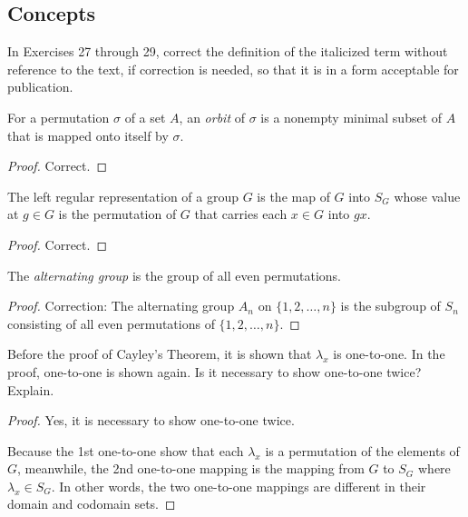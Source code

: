 \subsection*{Concepts}

In Exercises 27 through 29, correct the definition of the italicized term without reference to the text, if correction is needed, so that it is in a form acceptable for publication.

\begin{exercise}
    For a permutation $\sigma$ of a set $A$, an \textit{orbit} of $\sigma$ is a nonempty minimal subset of $A$ that is mapped onto itself by $\sigma$.
\end{exercise}

\begin{proof}
    Correct.
\end{proof}

\begin{exercise}
    The left regular representation of a group $G$ is the map of $G$ into $S_{G}$ whose value at $g\in G$ is the permutation of $G$ that carries each $x\in G$ into $gx$.
\end{exercise}

\begin{proof}
    Correct.
\end{proof}

\begin{exercise}
    The \textit{alternating group} is the group of all even permutations.
\end{exercise}

\begin{proof}
    Correction: The alternating group $A_{n}$ on $\{ 1, 2,\ldots, n \}$ is the subgroup of $S_{n}$ consisting of all even permutations of $\{ 1, 2,\ldots, n \}$.
\end{proof}

\begin{exercise}
    Before the proof of Cayley's Theorem, it is shown that $\lambda_{x}$ is one-to-one. In the proof, one-to-one is shown again. Is it necessary to show one-to-one twice? Explain.
\end{exercise}

\begin{proof}
    Yes, it is necessary to show one-to-one twice.

    Because the 1st one-to-one show that each $\lambda_{x}$ is a permutation of the elements of $G$, meanwhile, the 2nd one-to-one mapping is the mapping from $G$ to $S_{G}$ where $\lambda_{x}\in S_{G}$. In other words, the two one-to-one mappings are different in their domain and codomain sets.
\end{proof}

